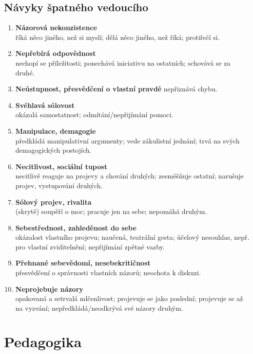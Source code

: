 \documentclass[a4paper,12pt]{report}
\begin{document}
\begin{samepage}
\section{Návyky špatného vedoucího}
\begin{enumerate}
 \item \textbf{Názorová nekonzistence} \\
 říká něco jiného, než si myslí; dělá něco jiného, než říká; protiřečí si.
 \item \textbf{Nepřebírá odpovědnost} \\
 nechopí se příležitosti; ponechává iniciativu na ostatních; schovává se za druhé.
 \item \textbf{Neústupnost, přesvědčení o vlastní pravdě} nepřiznává chybu.
 \item \textbf{Svéhlavá sólovost} \\
 okázalá samostatnost; odmítání/nepřijímání pomoci.
 \item \textbf{Manipulace, demagogie} \\
 předkládá manipulativní argumenty; vede zákulistní jednání; trvá na svých demagogických postojích.
 \item \textbf{Necitlivost, sociální tupost} \\
 necitlivě reaguje na projevy a chování druhých; zesměšňuje ostatní; narušuje projev, vystupování druhých.
 \item \textbf{Sólový projev, rivalita} \\
 (skrytě) soupěří o moc; pracuje jen na sebe; nepomáhá druhým.
 \item \textbf{Sebestřednost, zahleděnost do sebe} \\
 okázalost vlastního projevu; naučená, teatrální gesta; účelový nesouhlas, nepř. pro vlastní zviditelnění; nepřijímání zpětné vazby.
 \item \textbf{Přehnané sebevědomí, nesebekritičnost} \\
 přesvědčení o správnosti vlastních názorů; neochota k diskuzi.
 \item \textbf{Neprojebuje názory} \\
 opakovaná a setrvalá mlčenlivost; projevuje se jako poslední; projevuje se až na vyzvání; nepředkládá/neodkrývá své názory druhým.
\end{enumerate}
\end{samepage}

\newpage
\pagelogos
\chapter{Pedagogika}
\end{document}
